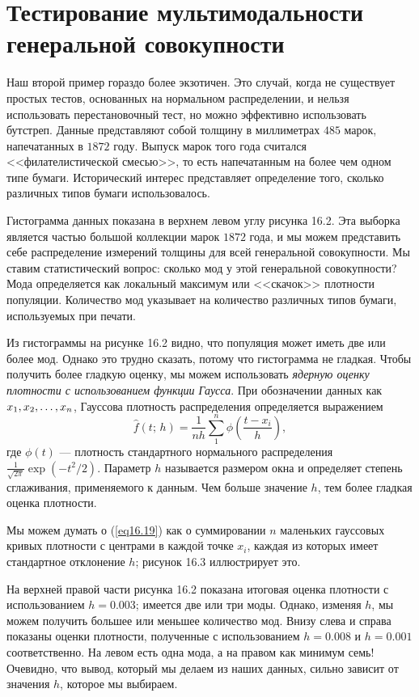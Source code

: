 \section{Тестирование мультимодальности генеральной совокупности}

Наш второй пример гораздо более экзотичен. Это случай, когда не существует простых тестов, основанных на нормальном распределении, и нельзя использовать перестановочный тест, но можно эффективно использовать бутстреп. Данные представляют собой толщину в миллиметрах $485$ марок, напечатанных в $1872$ году. Выпуск марок того года считался <<филателистической смесью>>, то есть напечатанным на более чем одном типе бумаги. Исторический интерес представляет определение того, сколько различных типов бумаги использовалось.

Гистограмма данных показана в верхнем левом углу рисунка 16.2. Эта выборка является частью большой коллекции марок $1872$ года, и мы можем представить себе распределение измерений толщины для всей генеральной совокупности. Мы ставим статистический вопрос: сколько мод у этой генеральной совокупности? Мода определяется как локальный максимум или <<скачок>> плотности популяции. Количество мод указывает на количество различных типов бумаги, используемых при печати.

Из гистограммы на рисунке 16.2 видно, что популяция может иметь две или более мод. Однако это трудно сказать, потому что гистограмма не гладкая. Чтобы получить более гладкую оценку, мы можем использовать \textit{ядерную оценку плотности с использованием функции Гаусса}. При обозначении данных как $x_1,x_2,\ldots,x_{n}$, Гауссова плотность распределения определяется выражением
\begin{equation}\label{eq16.19}
    \hat{f}(t;\,h) = \frac{1}{nh}\sum\limits_{1}^{n}\phi\left(\frac{t-x_i}{h}\right),
\end{equation}
где $\phi(t)$ --- плотность стандартного нормального распределения $\frac{1}{\sqrt{2\pi}}\exp\left(-t^2/2\right)$. Параметр $h$ называется размером окна и определяет степень сглаживания, применяемого к данным. Чем больше значение $h$, тем более гладкая оценка плотности.

Мы можем думать о (\ref{eq16.19}) как о суммировании $n$ маленьких гауссовых кривых плотности с центрами в каждой точке $x_i$, каждая из которых имеет стандартное отклонение $h$; рисунок 16.3 иллюстрирует это.

На верхней правой части рисунка 16.2 показана итоговая оценка плотности с использованием $h = 0.003$; имеется две или три моды. Однако, изменяя $h$, мы можем получить большее или меньшее количество мод. Внизу слева и справа показаны оценки плотности, полученные с использованием $h = 0.008$ и $h = 0.001$ соответственно. На левом есть одна мода, а на правом как минимум семь! Очевидно, что вывод, который мы делаем из наших данных, сильно зависит от значения $h$, которое мы выбираем.

